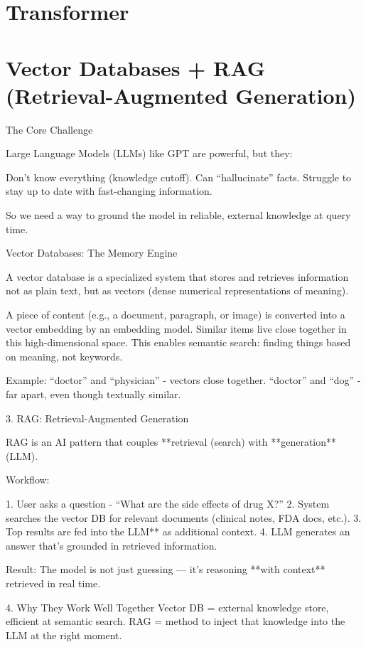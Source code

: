 \documentclass{article}
\begin{document}
    
\section{Transformer}

\section{Vector Databases + RAG (Retrieval-Augmented Generation)}

 The Core Challenge

Large Language Models (LLMs) like GPT are powerful, but they:

 Don’t know everything (knowledge cutoff).
 Can “hallucinate” facts.
 Struggle to stay up to date with fast-changing information.

So we need a way to ground the model in reliable, external knowledge at query time.

 Vector Databases: The Memory Engine

A vector database is a specialized system that stores and retrieves information not as plain text, but as vectors (dense numerical representations of meaning).

 A piece of content (e.g., a document, paragraph, or image) is converted into a vector embedding by an embedding model.
 Similar items live close together in this high-dimensional space.
 This enables semantic search: finding things based on meaning, not keywords.

Example:
“doctor” and “physician” - vectors close together.
“doctor” and “dog” - far apart, even though textually similar.

3. RAG: Retrieval-Augmented Generation

RAG is an AI pattern that couples **retrieval (search) with **generation** (LLM).

Workflow:

1. User asks a question - “What are the side effects of drug X?”
2. System searches the vector DB for relevant documents (clinical notes, FDA docs, etc.).
3. Top results are fed into the LLM** as additional context.
4. LLM generates an answer that’s grounded in retrieved information.

Result:
The model is not just guessing — it’s reasoning **with context** retrieved in real time.



 4. Why They Work Well Together
Vector DB = external knowledge store, efficient at semantic search.
RAG = method to inject that knowledge into the LLM at the right moment.
\end{document}
